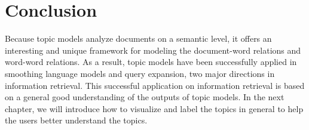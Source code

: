 \section{Conclusion}

Because topic models analyze documents on a semantic level, it offers
an interesting and unique framework for modeling the document-word
relations and word-word relations. As a result, topic models have been
successfully applied in smoothing language models and query expansion,
two major directions in information retrieval. This successful
application on information retrieval is based on a general good
understanding of the outputs of topic models. In the next chapter, we
will introduce how to visualize and label the topics in general to
help the users better understand the topics.







